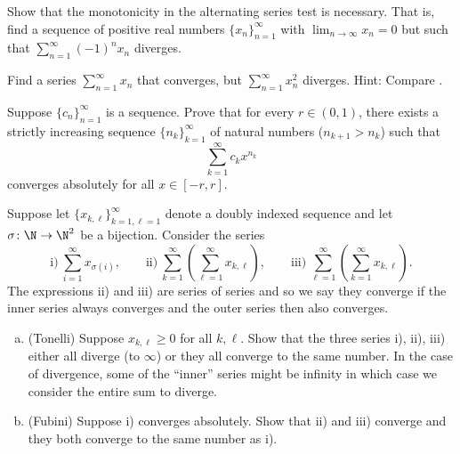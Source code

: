 \begin{exercise}[Challenging]
Show that the monotonicity in the alternating series test
is necessary.  That is, find a sequence of positive real numbers
$\{ x_n \}_{n=1}^\infty$ with $\lim_{n\to\infty} x_n = 0$ but such that
$\sum_{n=1}^\infty {(-1)}^n x_n$ diverges.
\end{exercise}

\begin{exercise}
Find a series
$\sum_{n=1}^\infty x_n$ that converges,
but $\sum_{n=1}^\infty x_n^2$ diverges.
Hint: Compare .
\end{exercise}

\begin{exercise}
Suppose $\{ c_n \}_{n=1}^\infty$ is a sequence.  Prove that for every $r \in (0,1)$,
there exists a strictly increasing sequence $\{ n_k \}_{k=1}^\infty$ of natural numbers
($n_{k+1} > n_k$) such that
\begin{equation*}
\sum_{k=1}^\infty c_k x^{n_k}
\end{equation*}
converges absolutely for all $x \in [-r,r]$.
\end{exercise}

\begin{exercise}
\label{exercise:tonellifubiniforsums}%
%
Suppose let $\{ x_{k,\ell} \}_{k=1,\ell=1}^\infty$ denote a doubly
indexed sequence and let $\sigma \colon \N \to \N^2$ be a bijection.
Consider the series
\begin{equation*}
\text{i)}~\sum_{i=1}^\infty x_{\sigma(i)},
\qquad
\text{ii)}~\sum_{k=1}^\infty \left( \sum_{\ell=1}^\infty x_{k,\ell} \right),
\qquad
\text{iii)}~\sum_{\ell=1}^\infty \left( \sum_{k=1}^\infty x_{k,\ell} \right) .
\end{equation*}
The expressions ii) and iii) are series of series and so we say they converge
if the inner series always converges and the outer series then also
converges.
\begin{enumerate}[a)]
\item
(Tonelli) Suppose $x_{k,\ell} \geq 0$ for all $k,\ell$.
Show that the three series i), ii), iii) either all diverge (to $\infty$)
or they all converge to the same number.
In the case of divergence, some of the ``inner'' series might be infinity
in which case we consider the entire sum to diverge.
\item
(Fubini) Suppose i) converges absolutely.  Show that ii) and iii)
converge and they both converge to the same number as i).
\end{enumerate}
\end{exercise}
